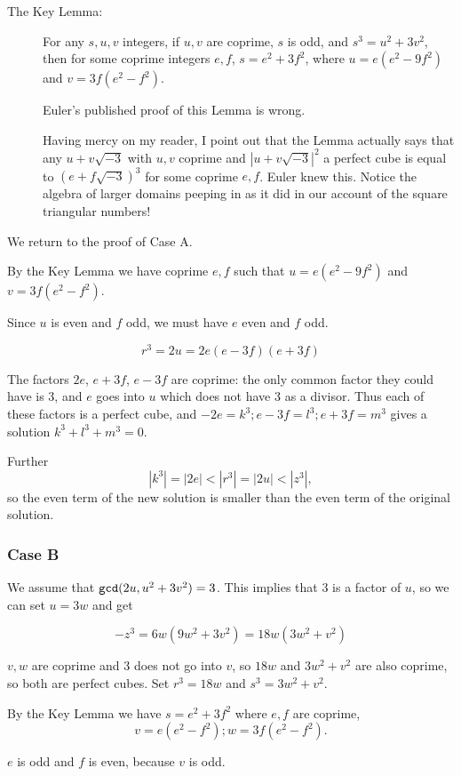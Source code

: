 \documentclass[12pt]{article}
\begin{document}
\begin{description}

\item[The Key Lemma:]  For any $s,u,v$ integers, if $u,v$ are coprime, $s$ is odd, and $s^3=u^2+3v^2$, then for some coprime integers $e,f$,
$s=e^2+3f^2$,  where $u=e(e^2-9f^2)$ and $v=3f(e^2-f^2)$.

Euler's published proof of this Lemma is wrong.

Having mercy on my reader, I point out that the Lemma actually says that any $u+v\sqrt{-3}$ with $u,v$ coprime and $|u+v\sqrt{-3}|^2$ a perfect cube
is equal to $(e+f\sqrt{-3})^3$ for some coprime $e,f$.  Euler knew this.  Notice the algebra of larger domains peeping in as it did in our account of the square triangular numbers!


\end{description}

We return to the proof of Case A.

By the Key Lemma we have coprime $e,f$ such that $u=e(e^2-9f^2)$ and $v=3f(e^2-f^2)$.

Since $u$ is even and $f$ odd, we must have $e$ even and $f$ odd.

$$r^3=2u=2e(e-3f)(e+3f)$$

The factors $2e$, $e+3f$, $e-3f$ are coprime:  the only common factor they could have is 3, and $e$ goes into $u$ which does not have 3 as a divisor.
Thus each of these factors is a perfect cube, and $-2e=k^3; e-3f=l^3; e+3f=m^3$ gives a solution $k^3+l^3+m^3=0$.

Further $$|k^3|=|2e|<|r^3|=|2u|<|z^3|,$$ so the even term of the new solution is smaller than the even term of the original solution.

\subsubsection{Case B}

We assume that ${\tt gcd}(2u,u^2+3v^2)=3$.  This implies that 3 is a factor of $u$, so we can set $u=3w$ and get

$$-z^3=6w(9w^2+3v^2)=18w(3w^2+v^2)$$

$v,w$ are coprime and 3 does not go into $v$, so $18w$ and $3w^2+v^2$ are also coprime, so both are perfect cubes.  Set
$r^3=18w$ and $s^3=3w^2+v^2$.

By the Key Lemma we have  $s=e^2+3f^2$ where $e,f$ are coprime, $$v=e(e^2-f^2); w=3f(e^2-f^2).$$

$e$ is odd and $f$ is even, because $v$ is odd.
\end{document}
